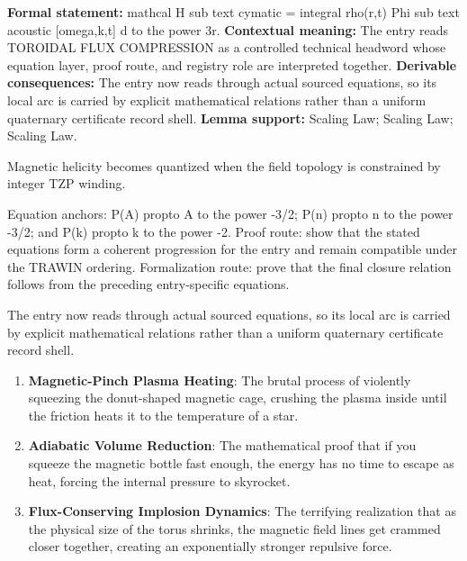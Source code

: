 \begingroup\footnotesize\setlength{\emergencystretch}{3em}\sloppy
\textbf{Formal statement:} mathcal H sub text cymatic = integral rho(r,t) Phi sub text acoustic [omega,k,t] d to the power 3r. \textbf{Contextual meaning:} The entry reads TOROIDAL FLUX COMPRESSION as a controlled technical headword whose equation layer, proof route, and registry role are interpreted together. \textbf{Derivable consequences:} The entry now reads through actual sourced equations, so its local arc is carried by explicit mathematical relations rather than a uniform quaternary certificate record shell. \textbf{Lemma support:} Scaling Law; Scaling Law; Scaling Law.\par
\endgroup

Magnetic helicity becomes quantized when the field topology is constrained by integer TZP winding.

Equation anchors: P(A) propto A to the power -3/2; P(n) propto n to the power -3/2; and P(k) propto k to the power -2. Proof route: show that the stated equations form a coherent progression for the entry and remain compatible under the TRAWIN ordering. Formalization route: prove that the final closure relation follows from the preceding entry-specific equations.

The entry now reads through actual sourced equations, so its local arc is carried by explicit mathematical relations rather than a uniform quaternary certificate record shell.
\endgroup

\begin{enumerate}[leftmargin=1.6em,itemsep=6pt,topsep=4pt]
\item \textbf{Magnetic-Pinch Plasma Heating}: The brutal process of violently squeezing the donut-shaped magnetic cage, crushing the plasma inside until the friction heats it to the temperature of a star.
\item \textbf{Adiabatic Volume Reduction}: The mathematical proof that if you squeeze the magnetic bottle fast enough, the energy has no time to escape as heat, forcing the internal pressure to skyrocket.
\item \textbf{Flux-Conserving Implosion Dynamics}: The terrifying realization that as the physical size of the torus shrinks, the magnetic field lines get crammed closer together, creating an exponentially stronger repulsive force.
\end{enumerate}

